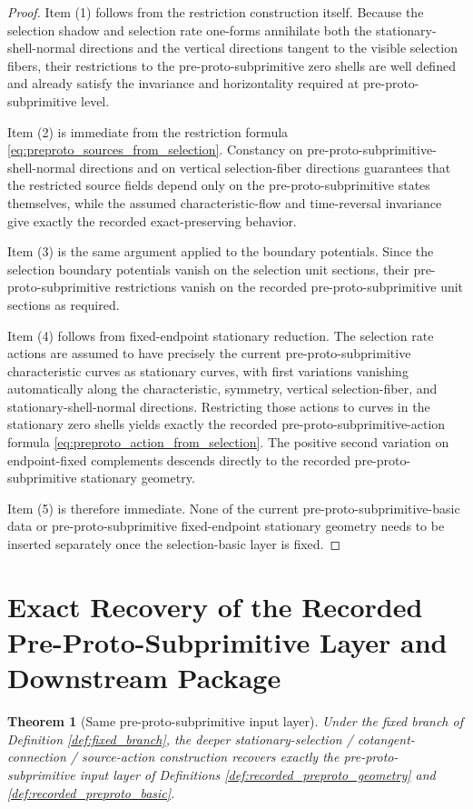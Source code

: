 \documentclass[11pt]{article}
\newtheorem{theorem}{Theorem}
\begin{document}
\begin{proof}
Item (1) follows from the restriction construction itself. Because the selection shadow and selection rate one-forms annihilate both the stationary-shell-normal directions and the vertical directions tangent to the visible selection fibers, their restrictions to the pre-proto-subprimitive zero shells are well defined and already satisfy the invariance and horizontality required at pre-proto-subprimitive level.

Item (2) is immediate from the restriction formula \eqref{eq:preproto_sources_from_selection}. Constancy on pre-proto-subprimitive-shell-normal directions and on vertical selection-fiber directions guarantees that the restricted source fields depend only on the pre-proto-subprimitive states themselves, while the assumed characteristic-flow and time-reversal invariance give exactly the recorded exact-preserving behavior.

Item (3) is the same argument applied to the boundary potentials. Since the selection boundary potentials vanish on the selection unit sections, their pre-proto-subprimitive restrictions vanish on the recorded pre-proto-subprimitive unit sections as required.

Item (4) follows from fixed-endpoint stationary reduction. The selection rate actions are assumed to have precisely the current pre-proto-subprimitive characteristic curves as stationary curves, with first variations vanishing automatically along the characteristic, symmetry, vertical selection-fiber, and stationary-shell-normal directions. Restricting those actions to curves in the stationary zero shells yields exactly the recorded pre-proto-subprimitive-action formula \eqref{eq:preproto_action_from_selection}. The positive second variation on endpoint-fixed complements descends directly to the recorded pre-proto-subprimitive stationary geometry.

Item (5) is therefore immediate. None of the current pre-proto-subprimitive-basic data or pre-proto-subprimitive fixed-endpoint stationary geometry needs to be inserted separately once the selection-basic layer is fixed.
\end{proof}

\section{Exact Recovery of the Recorded Pre-Proto-Subprimitive Layer and Downstream Package}

\begin{theorem}[Same pre-proto-subprimitive input layer]
\label{thm:same_preproto_input}
Under the fixed branch of Definition \ref{def:fixed_branch}, the deeper stationary-selection / cotangent-connection / source-action construction recovers exactly the pre-proto-subprimitive input layer of Definitions \ref{def:recorded_preproto_geometry} and \ref{def:recorded_preproto_basic}.
\end{theorem}
\end{document}
